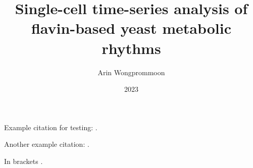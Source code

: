 \documentclass[11pt,crest,nopardent,msfonts,fancychap,hyper]{edengths}
\author{Arin Wongprommoon}
\title{Single-cell time-series analysis of flavin-based yeast metabolic rhythms}
\date{2023}
\begin{document}




\startbody



Example citation for testing: \textcite{papagiannakisAutonomousMetabolicOscillations2017}. 

Another example citation: \textcite{caustonMetabolicCyclesYeast2015}.

In brackets \parencite{baumgartnerFlavinbasedMetabolicCycles2018}.  










% 


\printbibliography

%
\end{document}
